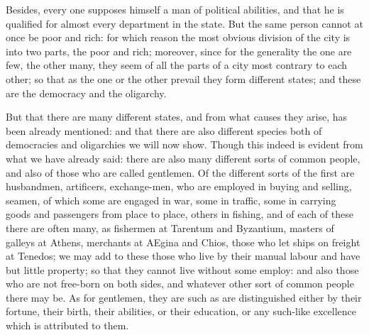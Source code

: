 Besides, every one supposes himself a man of political abilities, and that
he is qualified for almost every department in the state. But the same
person cannot at once be poor and rich: for which reason the most obvious
division of the city is into two parts, the poor and rich; moreover, since
for the generality the one are few, the other many, they seem of all the
parts of a city most contrary to each other; so that as the one or the
other prevail they form different states; and these are the democracy and
the oligarchy.

But that there are many different states, and from what causes they arise,
has been already mentioned: and that there are also different species both
of democracies and oligarchies we will now show. Though this indeed is
evident from what we have already said: there are also many different
sorts of common people, and also of those who are called gentlemen. Of the
different sorts of the first are husbandmen, artificers, exchange-men, who
are employed in buying and selling, seamen, of which some are engaged in
war, some in traffic, some in carrying goods and passengers from place to
place, others in fishing, and of each of these there are often many, as
fishermen at Tarentum and Byzantium, masters of galleys at Athens,
merchants at AEgina and Chios, those who let ships on freight at Tenedos;
we may add to these those who live by their manual labour and have but
little property; so that they cannot live without some employ: and also
those who are not free-born on both sides, and whatever other sort of
common people there may be. As for gentlemen, they are such as are
distinguished either by their fortune, their birth, their abilities, or
their education, or any such-like excellence which is attributed to them.

